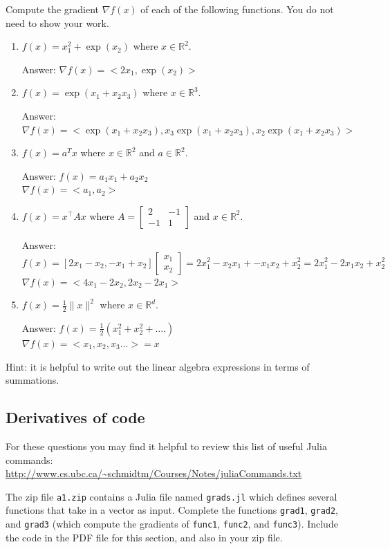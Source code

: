 \documentclass{article}
\def\ans#1{\par\gre{Answer: #1}}
\def\blu#1{{\color{blu}#1}}
\def\gre#1{{\color{gre}#1}}
\def\norm#1{\|#1\|}
\def\R{\mathbb{R}}
\begin{document}
\blu{Compute the gradient $\nabla f(x)$ of each of the following functions.} You do not need to show your work.
\begin{enumerate}
\item $f(x) = x_1^2 + \exp(x_2)$ where $x \in \R^2$.
\ans{$\nabla f(x) = <2x_1,\exp(x_2)>$}
\item $f(x) = \exp(x_1 + x_2x_3)$ where $x \in \mathbb{R}^3$.
\ans{$\nabla f(x) = <\exp(x_1+x_2x_3),x_3\exp(x_1+x_2x_3),x_2\exp(x_1+x_2x_3)>$}
\item $f(x) = a^Tx$ where $x \in \R^2$ and $a \in \R^2$.
\ans{$f(x) = a_1x_1+a_2x_2$\\$\nabla f(x) = <a_1,a_2> $}
\item $f(x) = x^\top A x$ where $A=\left[ \begin{array}{cc}
2 & -1 \\
 -1 & 1 \end{array} \right]$ and $x \in \mathbb{R}^2$.
\ans{$f(x) = [2x_1 - x_2, -x_1+x_2] \left[ \begin{array}{c}
    x_1\\x_2
 \end{array} \right] = 2x_1^2-x_2x_1+-x_1x_2+x_2^2 = 2x_1^2 - 2x_1x_2+x_2^2$\\
 $\nabla f(x) = <4x_1-2x_2,2x_2-2x_1>$
 } 
 \item $f(x) = \frac{1}{2}\norm{x}^2$ where $x \in \R^d$.
 \ans{$f(x) = \frac{1}{2}(x_1^2+x_2^2+....)$\\
 $\nabla f(x) = <x_1,x_2,x_3...> = x$
 }
\end{enumerate}

Hint: it is helpful to write out the linear algebra expressions in terms of summations.



\subsection{Derivatives of code}

For these questions you may find it helpful to review this list of useful Julia commands:\\
\url{http://www.cs.ubc.ca/~schmidtm/Courses/Notes/juliaCommands.txt}

The zip file \texttt{a1.zip} contains a Julia file named \texttt{grads.jl} which defines several functions that take in a vector as input. \blu{Complete the functions \texttt{grad1}, \texttt{grad2}, and \texttt{grad3} (which compute the gradients of \texttt{func1}, \texttt{func2}, and \texttt{func3})}. Include the code in the PDF file for this section, and also in your zip file.
\end{document}
